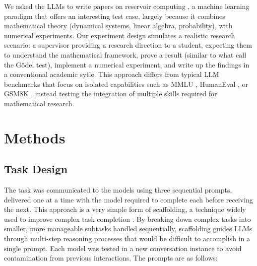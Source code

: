 \documentclass[11pt]{article}
\begin{document}
We asked the LLMs to write papers on reservoir computing \cite{jaeger2001,maass2002}, a machine learning paradigm that offers an interesting test case, largely because it combines mathematical theory (dynamical systems, linear algebra, probability), with numerical experiments.
Our experiment design simulates a realistic research scenario: a supervisor providing a research direction to a student, expecting them to understand the mathematical framework, prove a result (similar to what \cite{feldman2025} call the G\"{o}del test), implement a numerical experiment, and write up the findings in a conventional academic sytle. This approach differs from typical LLM benchmarks that focus on isolated capabilities such as MMLU \cite{hendrycks2021}, HumanEval \cite{chen2021}, or GSM8K \cite{cobbe2021}, instead testing the integration of multiple skills required for mathematical research.

\section{Methods}

\subsection{Task Design}

The task was communicated to the models using three sequential prompts, delivered one at a time with the model required to complete each before receiving the next. This approach is a very simple form of scaffolding, a technique widely used to improve complex task completion \cite{wu2022,suzgun2024}. By breaking down complex tasks into smaller, more manageable subtasks handled sequentially, scaffolding guides LLMs through multi-step reasoning processes that would be difficult to accomplish in a single prompt. Each model was tested in a new conversation instance to avoid contamination from previous interactions. The prompts are as follows:
\end{document}
